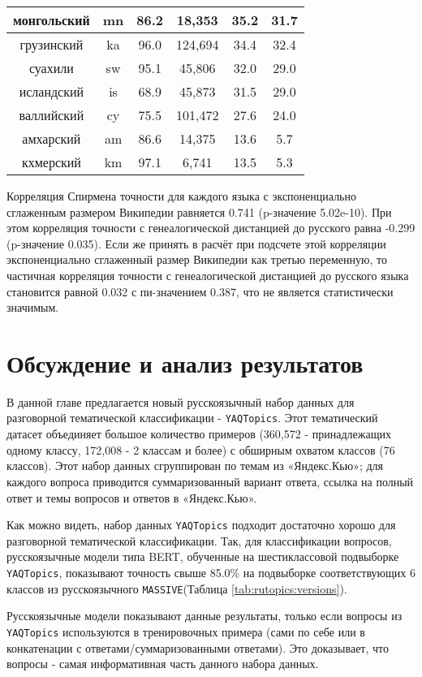 \begin{table*}
{\begin{tabular}{|c|c|c||c|c|c|}
монгольский & mn & 86.2 & 18,353 & 35.2 & 31.7\\ \hline
грузинский & ka & 96.0 & 124,694 & 34.4 & 32.4\\ \hline
суахили & sw & 95.1 & 45,806 & 32.0 & 29.0\\ \hline
исландский & is & 68.9 & 45,873 & 31.5 & 29.0\\ \hline
валлийский & cy & 75.5 & 101,472 & 27.6 & 24.0\\ \hline
амхарский & am & 86.6 & 14,375 & 13.6 & 5.7\\ \hline
кхмерский & km & 97.1 & 6,741 & 13.5 & 5.3\\ \hline
\end{tabular}
}
\end{table*}
Корреляция Спирмена точности для каждого языка с экспоненциально сглаженным размером Википедии равняется 0.741 (p-значение 5.02e-10). При этом корреляция точности с генеалогической дистанцией до русского равна -0.299 (p-значение 0.035). Если же принять в расчёт при подсчете этой корреляции экспоненциально сглаженный размер Википедии как третью переменную, то частичная корреляция точности с генеалогической дистанцией до русского языка становится равной 0.032 с пи-значением 0.387, что не является статистически значимым.


\section{Обсуждение и анализ результатов} 

В данной главе предлагается новый русскоязычный набор данных для разговорной тематической классификации - \texttt{YAQTopics}. Этот тематический датасет объединяет большое количество примеров (360,572 - принадлежащих одному классу, 172,008 - 2 классам и более) с обширным охватом классов (76 классов). Этот набор данных сгруппирован по темам из «Яндекс.Кью»; для каждого вопроса приводится суммаризованный вариант ответа, ссылка на полный ответ и темы вопросов и ответов в «Яндекс.Кью».

Как можно видеть, набор данных \texttt{YAQTopics} подходит достаточно хорошо для разговорной тематической классификации. Так, для классификации вопросов, русскоязычные модели типа BERT, обученные на шестиклассовой подвыборке \texttt{YAQTopics}, показывают точность свыше 85.0\% на подвыборке соответствующих 6 классов из русскоязычного \texttt{MASSIVE}(Таблица \ref{tab:rutopics:versions}). 

Русскоязычные модели показывают данные результаты, только если вопросы из  \texttt{YAQTopics} используются в тренировочных примера (сами по себе или в конкатенации с ответами/суммаризованными ответами). Это доказывает, что вопросы - самая информативная часть данного набора данных. 


